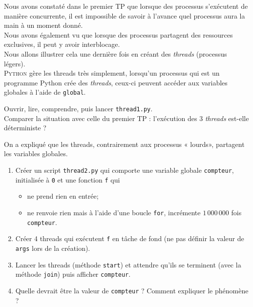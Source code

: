 \documentclass[12pt,a4paper,article,english,firamath]{nsi}
\begin{document}
\maketitle

Nous avons constaté dans le premier TP que lorsque des processus s'exécutent de manière concurrente, il est impossible de savoir à l'avance quel processus aura la main à un moment donné.\\

Nous avons également vu que lorsque des processus partagent des ressources exclusives, il peut y avoir interblocage.\\

Nous allons illustrer cela une dernière fois en créant des \textit{threads} (processus légers). \\

\textsc{Python} gère les threads très simplement, lorsqu'un processus qui est un programme Python crée des \textit{threads}, ceux-ci peuvent accéder aux variables globales à l'aide de \texttt{global}.

\begin{exercice}[]
Ouvrir, lire, comprendre, puis lancer \texttt{thread1.py}.\\
Comparer la situation avec celle du premier TP : l'exécution des 3 \textit{threads} est-elle déterministe ?
\end{exercice}

\begin{exercice}
On a expliqué que les threads, contrairement aux processus « lourds», partagent les variables globales.
\begin{enumerate}
	\item 	Créer un script \texttt{thread2.py} qui comporte une variable globale \texttt{compteur}, initialisée à \texttt{0} et une fonction \texttt{f} qui
            \begin{itemize}
            	\item 	ne prend rien en entrée;
            	\item 	ne renvoie rien mais à l'aide d'une boucle \texttt{for}, incrémente $1\,000\,000$ fois \texttt{compteur}.
            \end{itemize}
	\item 	Créer 4 threads qui exécutent \texttt{f} en tâche de fond (ne pas définir la valeur de \texttt{args} lors de la création).
    \item 	Lancer les threads (méthode \texttt{start}) et attendre qu'ils se terminent (avec la méthode \texttt{join}) puis afficher \texttt{compteur}.
    \item 	Quelle devrait être la valeur de \texttt{compteur} ? Comment expliquer le phénomène ?
\end{enumerate}
\end{exercice}
\end{document}
